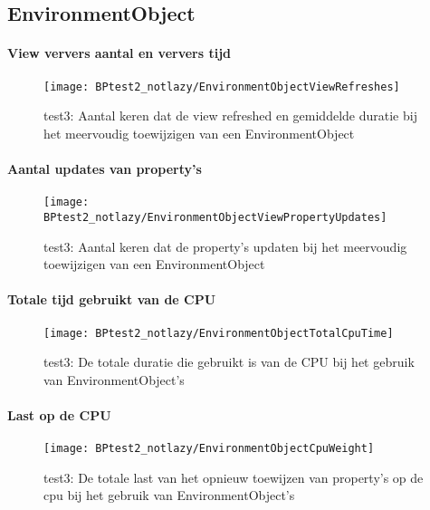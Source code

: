 \subsection{EnvironmentObject}
\paragraph{View ververs aantal en ververs tijd}
\begin{figure}[H]
    \centering
    \texttt{[image: BPtest2\_notlazy/EnvironmentObjectViewRefreshes]} 
    \caption{test3: Aantal keren dat de view refreshed en gemiddelde duratie bij het meervoudig toewijzigen van een EnvironmentObject}
    \label{fig:viewRefreshesEnvironmentObject3}
\end{figure}
\paragraph{Aantal updates van property's}
\begin{figure}[H]
    \centering
    \texttt{[image: BPtest2\_notlazy/EnvironmentObjectViewPropertyUpdates]} 
    \caption{test3: Aantal keren dat de property's updaten bij het meervoudig toewijzigen van een EnvironmentObject}
    \label{fig:propertyUpdatesEnvironmentObject3}
\end{figure}
\paragraph{Totale tijd gebruikt van de CPU}
\begin{figure}[H]
    \centering
    \texttt{[image: BPtest2\_notlazy/EnvironmentObjectTotalCpuTime]} 
    \caption{test3: De totale duratie die gebruikt is van de CPU bij het gebruik van EnvironmentObject's}
    \label{fig:cpuUsageTimeEnvironmentObject3}
\end{figure}
\paragraph{Last op de CPU}
\begin{figure}[H]
    \centering
    \texttt{[image: BPtest2\_notlazy/EnvironmentObjectCpuWeight]} 
    \caption{test3: De totale last van het opnieuw toewijzen van property's op de cpu bij het gebruik van EnvironmentObject's}
    \label{fig:cpuWeightEnvironmentObject3}
\end{figure}